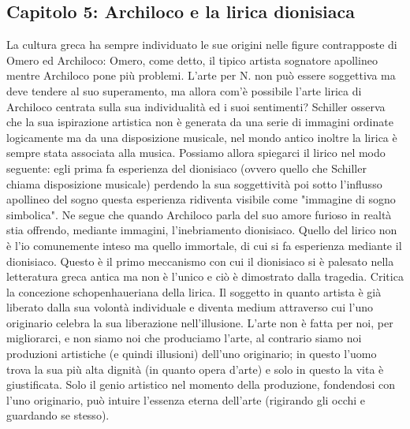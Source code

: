 \documentclass[10pt,a4paper]{article}
\begin{document}
\subsection{Capitolo 5: Archiloco e la lirica dionisiaca}
La cultura greca ha sempre individuato le sue origini nelle figure contrapposte di Omero ed Archiloco: Omero, come detto, il tipico artista sognatore apollineo mentre Archiloco pone più problemi. L'arte per N. non può essere soggettiva ma deve tendere al suo superamento, ma allora com'è possibile l'arte lirica di Archiloco centrata sulla sua individualità ed i suoi sentimenti? Schiller osserva che la sua ispirazione artistica non è generata da una serie di immagini ordinate logicamente ma da una disposizione musicale, nel mondo antico inoltre la lirica è sempre stata associata alla musica. Possiamo allora spiegarci il lirico nel modo seguente: egli prima fa esperienza del dionisiaco (ovvero quello che Schiller chiama disposizione musicale) perdendo la sua soggettività poi sotto l'influsso apollineo del sogno questa esperienza ridiventa visibile come "immagine di sogno simbolica". Ne segue che quando Archiloco parla del suo amore furioso in realtà stia offrendo, mediante immagini, l'inebriamento dionisiaco. Quello del lirico non è l'io comunemente inteso ma quello immortale, di cui si fa esperienza mediante il dionisiaco. Questo è il primo meccanismo con cui il dionisiaco si è palesato nella letteratura greca antica ma non è l'unico e ciò è dimostrato dalla tragedia. Critica la concezione schopenhaueriana della lirica. Il soggetto in quanto artista è già liberato dalla sua volontà individuale e diventa medium attraverso cui l'uno originario celebra la sua liberazione nell'illusione. L'arte non è fatta per noi, per migliorarci, e non siamo noi che produciamo l'arte, al contrario siamo noi produzioni artistiche (e quindi illusioni) dell'uno originario; in questo l'uomo trova la sua più alta dignità (in quanto opera d'arte) e solo in questo la vita è giustificata. Solo il genio artistico nel momento della produzione, fondendosi con l'uno originario, può intuire l'essenza eterna dell'arte (rigirando gli occhi e guardando se stesso). 
\end{document}
